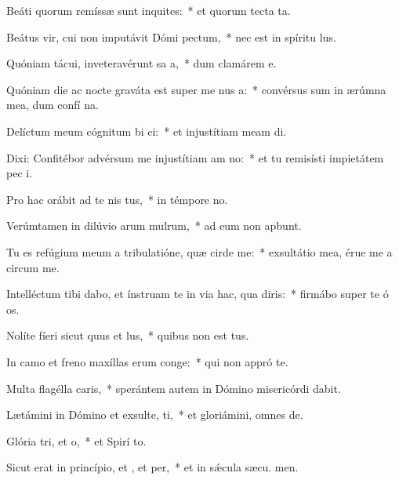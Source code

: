 \item Beáti quorum remíssæ sunt inquites:~* et quorum tecta  ta.
\item Beátus vir, cui non imputávit Dómi pectum,~* nec est in spíritu  lus.
\item Quóniam tácui, inveteravérunt sa a,~* dum clamárem  e.
\item Quóniam die ac nocte graváta est super me nus a:~* convérsus sum in ærúmna mea, dum confí na.
\item Delíctum meum cógnitum bi ci:~* et injustítiam meam  di.
\item Dixi: Confitébor advérsum me injustítiam am no:~* et tu remisísti impietátem pec i.
\item Pro hac orábit ad te nis tus,~* in témpore no.
\item Verúmtamen in dilúvio arum mulrum,~* ad eum non apbunt.
\item Tu es refúgium meum a tribulatióne, quæ cirde me:~* exsultátio mea, érue me a circum me.
\item Intelléctum tibi dabo, et ínstruam te in via hac, qua diris:~* firmábo super te ó os.
\item Nolíte fíeri sicut quus et lus,~* quibus non est tus.
\item In camo et freno maxíllas erum conge:~* qui non appró  te.
\item Multa flagélla caris,~* sperántem autem in Dómino misericórdi dabit.
\item Lætámini in Dómino et exsulte, ti,~* et gloriámini, omnes  de.
\item Glória tri, et o,~* et Spirí to.
\item Sicut erat in princípio, et , et per,~* et in sǽcula sæcu. men.
